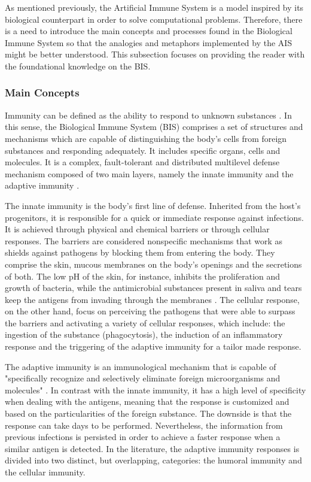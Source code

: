 As mentioned previously, the Artificial Immune System is a model inspired by its biological counterpart in order to solve computational problems. Therefore, there is a need to introduce the main concepts and processes found in the Biological Immune System so that the analogies and metaphors implemented by the AIS might be better understood. This subsection focuses on providing the reader with the foundational knowledge on the BIS. 

\subsubsection{Main Concepts}

Immunity can be defined as the ability to respond to unknown substances \cite{ICBook2009}. In this sense, the Biological Immune System (BIS) comprises a set of structures and mechanisms which are capable of distinguishing the body's cells from foreign substances and responding adequately. It includes specific organs, cells and molecules. It is a complex, fault-tolerant and distributed multilevel defense mechanism composed of two main layers, namely the innate immunity and the adaptive immunity \cite{Kuby2019}. 

The innate immunity is the body's first line of defense. Inherited from the host's progenitors, it is responsible for a quick or immediate response against infections. It is achieved through physical and chemical barriers or through cellular responses. The barriers are considered nonspecific mechanisms that work as shields against pathogens by blocking them from entering the body. They comprise the skin, mucous membranes on the body's openings and the secretions of both. The low pH of the skin, for instance, inhibits the proliferation and growth of bacteria, while the antimicrobial substances present in saliva and tears keep the antigens from invading through the membranes \cite{ICBook2009}. The cellular response, on the other hand, focus on perceiving the pathogens that were able to surpass the barriers and activating a variety of cellular responses, which include: the ingestion of the substance (phagocytosis), the induction of an inflammatory response and the triggering of the adaptive immunity for a tailor made response. 

The adaptive immunity is an immunological mechanism that is capable of "specifically recognize and selectively eliminate foreign microorganisms and molecules" \cite{ICBook2009}. In contrast with the innate immunity, it has a high level of specificity when dealing with the antigens, meaning that the response is customized and based on the particularities of the foreign substance. The downside is that the response can take days to be performed. Nevertheless, the information from previous infections is persisted in order to achieve a faster response when a similar antigen is detected. In the literature, the adaptive immunity responses is divided into two distinct, but overlapping, categories: the humoral immunity and the cellular immunity.


